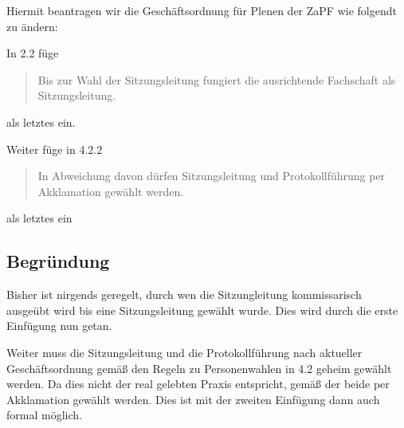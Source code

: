 \documentclass[draft,10pt,oneside]{scrartcl}
\begin{document}
Hiermit beantragen wir die Geschäftsordnung für Plenen der ZaPF wie folgendt zu ändern:

In 2.2 füge
\begin{quote}
	Bis zur Wahl der Sitzungsleitung fungiert die ausrichtende Fachschaft als
	Sitzungsleitung.
\end{quote}
als letztes ein.
\vspace{0.25cm}

Weiter füge in 4.2.2
\begin{quote}
	In Abweichung davon dürfen Sitzungsleitung und Protokollführung per
	Akklamation gewählt werden.
\end{quote}
als letztes ein

\subsection*{Begründung}
Bisher ist nirgends geregelt, durch wen die Sitzungleitung kommissarisch
ausgeübt wird bis eine Sitzungsleitung gewählt wurde. Dies wird durch die erste
Einfügung nun getan.

Weiter muss die Sitzungsleitung und die Protokollführung nach aktueller
Geschäftsordnung gemäß den Regeln zu Personenwahlen in 4.2 geheim gewählt
werden. Da dies nicht der real gelebten Praxis entspricht, gemäß der beide per
Akklamation gewählt werden. Dies ist mit der zweiten Einfügung dann auch formal
möglich.
\end{document}
